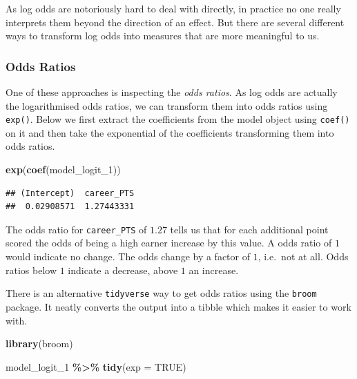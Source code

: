 \documentclass[
]{book}
\newenvironment{Shaded}{\begin{snugshade}}{\end{snugshade}}
\newcommand{\AttributeTok}[1]{\textcolor[rgb]{0.13,0.29,0.53}{#1}}
\newcommand{\ConstantTok}[1]{\textcolor[rgb]{0.56,0.35,0.01}{#1}}
\newcommand{\FunctionTok}[1]{\textcolor[rgb]{0.13,0.29,0.53}{\textbf{#1}}}
\newcommand{\NormalTok}[1]{#1}
\newcommand{\SpecialCharTok}[1]{\textcolor[rgb]{0.81,0.36,0.00}{\textbf{#1}}}
\begin{document}
As log odds are notoriously hard to deal with directly, in practice no
one really interprets them beyond the direction of an effect. But there
are several different ways to transform log odds into measures that are
more meaningful to us.

\hypertarget{odds-ratios}{%
\subsubsection{Odds Ratios}\label{odds-ratios}}

One of these approaches is inspecting the \emph{odds ratios}. As log odds are
actually the logarithmised odds ratios, we can transform them into odds
ratios using \texttt{exp()}. Below we first extract the coefficients from the
model object using \texttt{coef()} on it and then take the exponential of the
coefficients transforming them into odds ratios.

\begin{Shaded}
\begin{Highlighting}[]
\FunctionTok{exp}\NormalTok{(}\FunctionTok{coef}\NormalTok{(model\_logit\_1))}
\end{Highlighting}
\end{Shaded}

\begin{verbatim}
## (Intercept)  career_PTS 
##  0.02908571  1.27443331
\end{verbatim}

The odds ratio for \texttt{career\_PTS} of \(1.27\) tells us that for each
additional point scored the odds of being a high earner increase by this
value. A odds ratio of \(1\) would indicate no change. The odds change by
a factor of \(1\), i.e.~not at all. Odds ratios below \(1\) indicate a
decrease, above \(1\) an increase.

There is an alternative \texttt{tidyverse} way to get odds ratios using the
\texttt{broom} package. It neatly converts the output into a tibble which makes
it easier to work with.

\begin{Shaded}
\begin{Highlighting}[]
\FunctionTok{library}\NormalTok{(broom)}

\NormalTok{model\_logit\_1 }\SpecialCharTok{\%\textgreater{}\%} 
      \FunctionTok{tidy}\NormalTok{(}\AttributeTok{exp =} \ConstantTok{TRUE}\NormalTok{)}
\end{Highlighting}
\end{Shaded}
\end{document}
